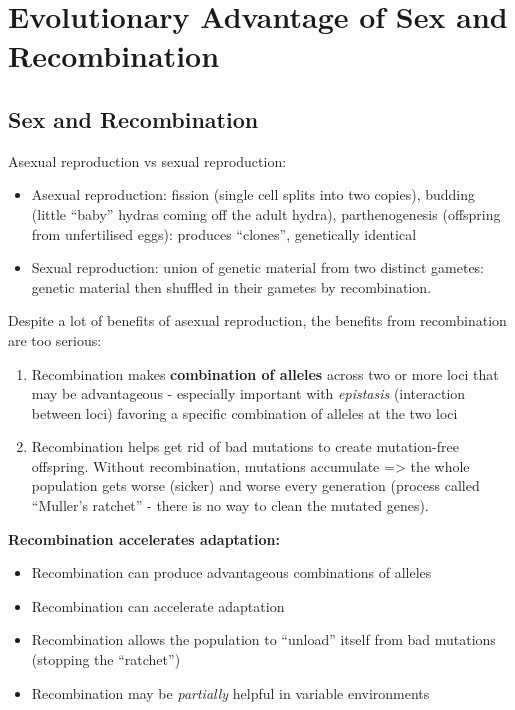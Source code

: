 \documentclass{scrartcl}
\begin{document}
\section{Evolutionary Advantage of Sex and Recombination}
\label{sec:08}
\subsection{Sex and Recombination}
\label{sec:08-01}
Asexual reproduction vs sexual reproduction:
\begin{itemize}
\item Asexual reproduction: fission (single cell splits into two copies), budding (little ``baby'' hydras coming off the adult hydra), parthenogenesis (offspring from unfertilised eggs): produces ``clones'', genetically identical
\item Sexual reproduction: union of genetic material from two distinct gametes: genetic material then shuffled in their gametes by recombination.
\end{itemize}
Despite a lot of benefits of asexual reproduction, the benefits from recombination are too serious:
\begin{enumerate}
\item Recombination makes {\bf combination of alleles } across two or more loci that may be advantageous - especially important with {\em epistasis} (interaction between loci) favoring a specific combination of alleles at the two loci
\item Recombination helps get rid of bad mutations to create mutation-free offspring. Without recombination, mutations accumulate => the whole population gets worse (sicker) and worse every generation (process called ``Muller's ratchet'' - there is no way to clean the mutated genes).
\end{enumerate}
{\bf Recombination accelerates adaptation:}
\begin{itemize}
\item Recombination can produce advantageous combinations of alleles
\item Recombination can accelerate adaptation
\item Recombination allows the population to ``unload'' itself from bad mutations (stopping the ``ratchet'')
\item Recombination may be {\em partially} helpful in variable environments
\end{itemize}

\end{document}
